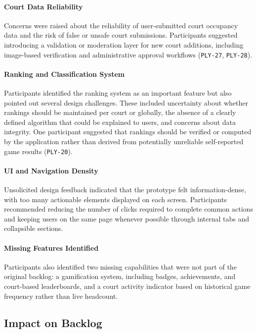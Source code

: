 \paragraph{Court Data Reliability}
Concerns were raised about the reliability of user-submitted court occupancy data and the risk of false or unsafe court submissions. Participants suggested introducing a validation or moderation layer for new court additions, including image-based verification and administrative approval workflows (\texttt{PLY-27}, \texttt{PLY-28}).


\paragraph{Ranking and Classification System}
Participants identified the ranking system as an important feature but also pointed out several design challenges. These included uncertainty about whether rankings should be maintained per court or globally, the absence of a clearly defined algorithm that could be explained to users, and concerns about data integrity. One participant suggested that rankings should be verified or computed by the application rather than derived from potentially unreliable self-reported game results (\texttt{PLY-20}).

\paragraph{UI and Navigation Density}
Unsolicited design feedback indicated that the prototype felt information-dense, with too many actionable elements displayed on each screen. Participants recommended reducing the number of clicks required to complete common actions and keeping users on the same page whenever possible through internal tabs and collapsible sections. 


\paragraph{Missing Features Identified}
Participants also identified two missing capabilities that were not part of the original backlog: a gamification system, including badges, achievements, and court-based leaderboards, and a court activity indicator based on historical game frequency rather than live headcount.

\subsection{Impact on Backlog}
\label{subsec:rp-eval1-impact}

